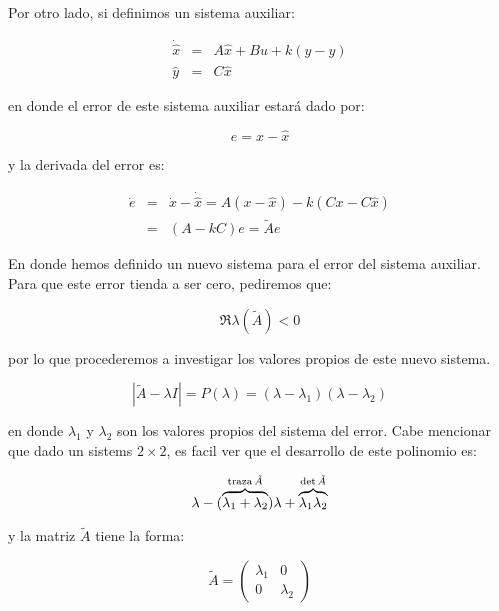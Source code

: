 		Por otro lado, si definimos un sistema auxiliar:

		\begin{eqnarray*}
			\dot{\hat{x}} & = & A \hat{x} + B u + k (y - \hat{y}) \\
			\hat{y} & = & C \hat{x}
		\end{eqnarray*}

		en donde el error de este sistema auxiliar estará dado por:

		\begin{equation*}
			e = x - \hat{x}
		\end{equation*}

		y la derivada del error es:

		\begin{eqnarray*}
			\dot{e} & = & \dot{x} - \dot{\hat{x}} = A(x - \hat{x}) - k (Cx - C\hat{x}) \\
			& = & (A - k C) e = \tilde{A} e
		\end{eqnarray*}

		En donde hemos definido un nuevo sistema para el error del sistema auxiliar.
		Para que este error tienda a ser cero, pediremos que:

		\begin{equation*}
			\Re{\lambda(\tilde{A})} < 0
		\end{equation*}

		por lo que procederemos a investigar los valores propios de este nuevo sistema.

		\begin{equation*}
			|\tilde{A} - \lambda I| = P(\lambda) = (\lambda - \lambda_1) (\lambda - \lambda_2)
		\end{equation*}

		en donde $\lambda_1$ y $\lambda_2$ son los valores propios del sistema del error.
		Cabe mencionar que dado un sistems $2 \times 2$, es facil ver que el desarrollo de este polinomio es:

		\begin{equation*}
			\lambda - (\overbrace{\lambda_1 + \lambda_2}^{\operatorname{traza}{\tilde{A}}}) \lambda + \overbrace{\lambda_1 \lambda_2}^{\det{\tilde{A}}}
		\end{equation*}

		y la matriz $\tilde{A}$ tiene la forma:

		\begin{equation*}
			\tilde{A} =
			\begin{pmatrix}
				\lambda_1 & 0 \\
				0 & \lambda_2
			\end{pmatrix}
		\end{equation*}

